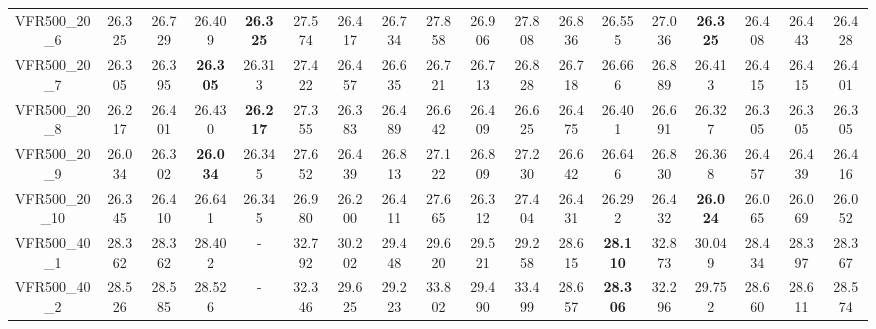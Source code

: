 \begin{tabular}{cc|ccc|ccccccccccccc}
VFR500\_20\_6      & 26.325           & 26.729           & 26.409           & {\bf 26.325}     & 27.574           & 26.417           & 26.734           & 27.858           & 26.906           & 27.808           & 26.836           & 26.555           & 27.036           & {\bf 26.325}     & 26.408           & 26.443           & 26.428          \\ 
VFR500\_20\_7      & 26.305           & 26.395           & {\bf 26.305}     & 26.313           & 27.422           & 26.457           & 26.635           & 26.721           & 26.713           & 26.828           & 26.718           & 26.666           & 26.889           & 26.413           & 26.415           & 26.415           & 26.401          \\ 
VFR500\_20\_8      & 26.217           & 26.401           & 26.430           & {\bf 26.217}     & 27.355           & 26.383           & 26.489           & 26.642           & 26.409           & 26.625           & 26.475           & 26.401           & 26.691           & 26.327           & 26.305           & 26.305           & 26.305          \\ 
VFR500\_20\_9      & 26.034           & 26.302           & {\bf 26.034}     & 26.345           & 27.652           & 26.439           & 26.813           & 27.122           & 26.809           & 27.230           & 26.642           & 26.646           & 26.830           & 26.368           & 26.457           & 26.439           & 26.416          \\ 
VFR500\_20\_10     & 26.345           & 26.410           & 26.641           & 26.345           & 26.980           & 26.200           & 26.411           & 27.665           & 26.312           & 27.404           & 26.431           & 26.292           & 26.432           & {\bf 26.024}     & 26.065           & 26.069           & 26.052          \\ 
VFR500\_40\_1      & 28.362           & 28.362           & 28.402           & -                & 32.792           & 30.202           & 29.448           & 29.620           & 29.521           & 29.258           & 28.615           & {\bf 28.110}     & 32.873           & 30.049           & 28.434           & 28.397           & 28.367          \\ 
VFR500\_40\_2      & 28.526           & 28.585           & 28.526           & -                & 32.346           & 29.625           & 29.223           & 33.802           & 29.490           & 33.499           & 28.657           & {\bf 28.306}     & 32.296           & 29.752           & 28.660           & 28.611           & 28.574          \\ 

\end{tabular}
